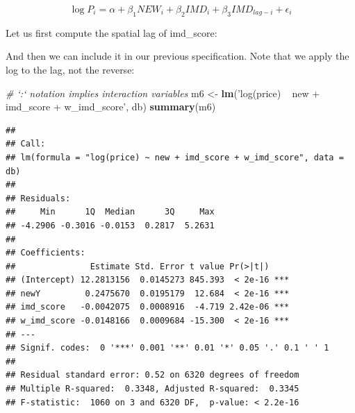 \documentclass[]{book}
\newenvironment{Shaded}{\begin{snugshade}}{\end{snugshade}}
\newcommand{\KeywordTok}[1]{\textcolor[rgb]{0.13,0.29,0.53}{\textbf{#1}}}
\newcommand{\StringTok}[1]{\textcolor[rgb]{0.31,0.60,0.02}{#1}}
\newcommand{\CommentTok}[1]{\textcolor[rgb]{0.56,0.35,0.01}{\textit{#1}}}
\newcommand{\OperatorTok}[1]{\textcolor[rgb]{0.81,0.36,0.00}{\textbf{#1}}}
\newcommand{\NormalTok}[1]{#1}
\begin{document}
\[
\log{P_i} = \alpha + \beta_{1} NEW_i + \beta_{2} IMD_i + \beta_{3} IMD_{lag-i} + \epsilon_i
\]

Let us first compute the spatial lag of imd\_score:

\begin{Shaded}
\end{Shaded}

And then we can include it in our previous specification. Note that we
apply the log to the lag, not the reverse:

\begin{Shaded}
\begin{Highlighting}[]
\CommentTok{# `:` notation implies interaction variables}
\NormalTok{m6 <-}\StringTok{ }\KeywordTok{lm}\NormalTok{(}\StringTok{'log(price) ~ new + imd_score + w_imd_score'}\NormalTok{, db)}
\KeywordTok{summary}\NormalTok{(m6)}
\end{Highlighting}
\end{Shaded}

\begin{verbatim}
## 
## Call:
## lm(formula = "log(price) ~ new + imd_score + w_imd_score", data = db)
## 
## Residuals:
##     Min      1Q  Median      3Q     Max 
## -4.2906 -0.3016 -0.0153  0.2817  5.2631 
## 
## Coefficients:
##               Estimate Std. Error t value Pr(>|t|)    
## (Intercept) 12.2813156  0.0145273 845.393  < 2e-16 ***
## newY         0.2475670  0.0195179  12.684  < 2e-16 ***
## imd_score   -0.0042075  0.0008916  -4.719 2.42e-06 ***
## w_imd_score -0.0148166  0.0009684 -15.300  < 2e-16 ***
## ---
## Signif. codes:  0 '***' 0.001 '**' 0.01 '*' 0.05 '.' 0.1 ' ' 1
## 
## Residual standard error: 0.52 on 6320 degrees of freedom
## Multiple R-squared:  0.3348, Adjusted R-squared:  0.3345 
## F-statistic:  1060 on 3 and 6320 DF,  p-value: < 2.2e-16
\end{verbatim}
\end{document}

